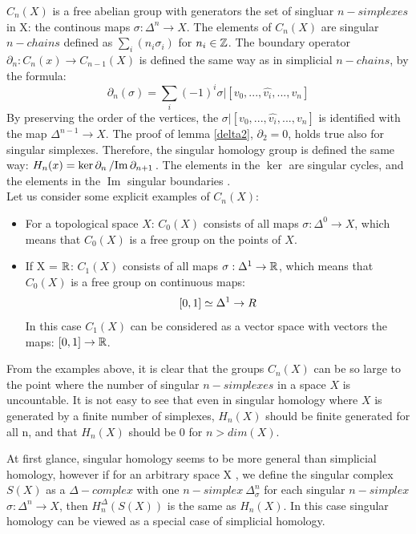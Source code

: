 \documentclass[11pt,a4paper]{report}
\DeclareMathOperator{\Ima}{Im}
\begin{document}
     $C_n(X)$ is a free abelian group with generators the set of singluar $n-simplexes$ in X: the continous maps $\sigma: \Delta^n \rightarrow X$. The elements of $C_n(X)$ are singular $n-chains$ defined as $\sum_i(n_i\sigma_i)$ for $n_i \in \mathbb{Z}$. The boundary operator $\partial_n: C_n(x) \rightarrow C_{n-1}(X)$ is defined the same way as in simplicial $n-chains$, by the formula:
     \[
		         \partial_n(\sigma) = \sum\limits_i (-1)^i \sigma | [v_0, ... ,\hat{v_i}, ... , v_n]
              \]
     By preserving the order of the vertices, the $\sigma |[v_0, ... ,\hat{v_i}, ... , v_n]$ is identified with the map $\Delta^{n-1} \rightarrow X$. The proof of lemma \ref{delta2}, $\partial_2 = 0$, holds true also for singular simplexes. Therefore, the singular homology group is defined the same way: $H_n(x) = \ker\partial_n \left/ \Ima \partial_{n+1} \right.$. The elements in the $\ker$ are singular cycles, and the elements in the $\Ima$ singular boundaries \cite{hatcher}. \\

      Let us consider some explicit examples of $C_n(X)$:
      \begin{itemize}
       \item
      For a topological space $X$:
      $C_0(X)$ consists of all maps $\sigma: \Delta^0 \rightarrow X$, which means that $C_0(X)$ is a free group on the points of $X$.
      \item
      If X = $\mathbb{R}$: $C_1(X)$ consists of all maps $\sigma: \Delta^1 \rightarrow \mathbb{R}$, which means that $C_0(X)$ is a free group on continuous maps:
      \[
        [0, 1] \simeq \Delta^1 \rightarrow \\R
      \]
      In this case $C_1(X)$ can be considered as a vector space with vectors the maps: $[0, 1] \rightarrow \mathbb{R}$.
      \end{itemize}

    From the examples above, it is clear that the groups $C_n(X)$ can be so large to the point where the number of singular $n-simplexes$ in a space $X$ is uncountable. It is not easy to see that even in singular homology where $X$ is generated by a finite number of simplexes, $H_n(X)$ should be finite generated for all n, and that $H_n(X)$ should be 0 for $n > dim(X)$.

    At first glance, singular homology seems to be more general than simplicial homology, however if for an arbitrary space X , we define the singular complex $S(X)$ as a $\Delta-complex$ with one $n-simplex \ \Delta_\sigma^n$ for each singular $n-simplex$ $\sigma: \Delta^n \rightarrow X$, then $H_n^\Delta(S(X))$ is the same as $H_n(X)$. In this case singular homology can be viewed as a special case of simplicial homology.
\end{document}

